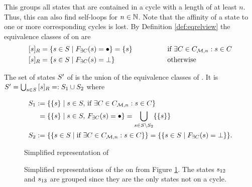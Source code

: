 \documentclass[preview]{standalone}
\begin{document}
This \viewN groups all states that are contained in a cycle with a length of at least $n$. Thus, this \viewN can also find self-loops for $n \in {\mathbb{N}}$. Note that the affinity of a state to one or more corresponding cycles is lost. 
\noindent By Definition \ref{def:eqrelview} the equivalence classes of \eqrelview on \states are
\begin{alignat*}{3}
	\eqclassv &= \{\state \in \states \mid \gfcthascycle(\state) = \remelem\} = \{\state\} \quad\quad\quad\quad&&\text{if } \exists \cycle \in \cycleset : \state \in \cycle \\
	\eqclassv &= \{\state \in \states \mid \gfcthascycle(\state) = \notppty\} &&\text{otherwise}
\end{alignat*}

\pagebreak

\noindent The set of states ${S}'$ of \viewhascycle is the union of the equivalence classes of \eqrelview. It is ${S}' = \bigcup_{{s} \in {S}} {{[{s}]_{{R}}}} =: {S}_1 \cup {S}_2$ where

\begin{align*}
	\states_1 &:= \{\{\state\} \mid \state \in \states, \,\text{if } \exists \cycle \in \cycleset : \state \in \cycle\} \\
	&\;= \{\{\state\} \mid \state \in \states, \, \gfcthascycle(\state) = \remelem\} = \nogroupstates \\
	\states_2 &:= \{\{\state \in \states \mid \text{if } \exists \cycle \in \cycleset : \state \in \cycle \}\} = \{\{\state \in \states \mid \gfcthascycle(\state) = \notppty\}\}.
\end{align*}

\begin{figure}[!htb]
	\centering
				
	\caption{Simplified representation of \mdp}
	\label{fig:cyclesBefore} 
\end{figure}

\begin{figure}[!htb]
	\centering
	
	\caption{Simplified representations of the \viewN \viewhascycle on \chgph from Figure \ref{fig:cyclesBefore}. The states ${s}_{12}$ and ${s}_{13}$ are grouped since they are the only states not on a cycle.}
	\label{fig:cycleAfterHas} 
\end{figure}
\end{document}
